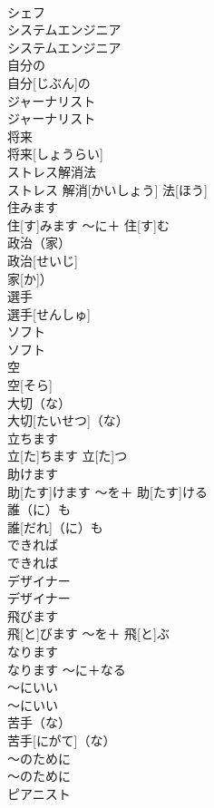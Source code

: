 \documentclass[8pt]{extreport}
\begin{document}
\begin{CJK}{UTF8}{min}
\\	シェフ		
\\	システムエンジニア	
\\	システムエンジニア		
\\	自分の	
\\	自分[じぶん]の		
\\	ジャーナリスト	
\\	ジャーナリスト		
\\	将来	
\\	将来[しょうらい]		
\\	ストレス解消法	
\\	ストレス 解消[かいしょう] 法[ほう]		
\\	住みます	
\\	住[す]みます	〜に＋ 住[す]む	
\\	政治（家）	
\\	政治[せいじ]
\\	家[か]）		
\\	選手	
\\	選手[せんしゅ]		
\\	ソフト	
\\	ソフト		
\\	空	
\\	空[そら]		
\\	大切（な）	
\\	大切[たいせつ]（な）		
\\	立ちます	
\\	立[た]ちます	立[た]つ	
\\	助けます	
\\	助[たす]けます	〜を＋ 助[たす]ける	
\\	誰（に）も	
\\	誰[だれ]（に）も		
\\	できれば	
\\	できれば		
\\	デザイナー	
\\	デザイナー		
\\	飛びます	
\\	飛[と]びます	〜を＋ 飛[と]ぶ	
\\	なります	
\\	なります	〜に＋なる	
\\	〜にいい	
\\	〜にいい		
\\	苦手（な）	
\\	苦手[にがて]（な）		
\\	〜のために	
\\	〜のために		
\\	ピアニスト	

\end{CJK}
\end{document}
